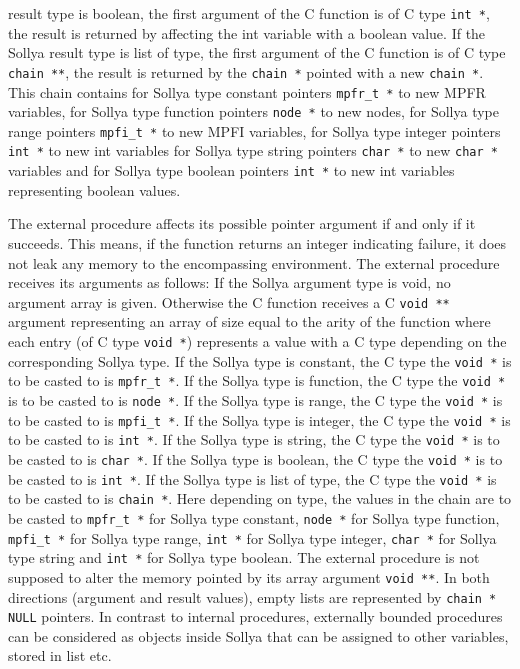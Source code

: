 \begin{itemize}
   result type is boolean, the first argument of the C function is of C
   type \texttt{int *}, the result is returned by affecting the int variable with
   a boolean value.  If the Sollya result type is list of type, the
   first argument of the C function is of C type \texttt{chain **}, the result is
   returned by the \texttt{chain *} pointed with a new \texttt{chain *}.  This chain
   contains for Sollya type constant pointers \texttt{mpfr\_t *} to new MPFR
   variables, for Sollya type function pointers \texttt{node *} to new nodes, for
   Sollya type range pointers \texttt{mpfi\_t *}  to new MPFI variables, for
   Sollya type integer pointers \texttt{int *} to new int variables for Sollya
   type string pointers \texttt{char *} to new \texttt{char *} variables and for Sollya
   type boolean pointers \texttt{int *} to new int variables representing boolean
   values.
   	       
   The external procedure affects its possible pointer argument if and
   only if it succeeds.  This means, if the function returns an integer
   indicating failure, it does not leak any memory to the encompassing
   environment.
   The external procedure receives its arguments as follows: If the
   Sollya argument type is void, no argument array is given.  Otherwise
   the C function receives a C \texttt{void **} argument representing an array of
   size equal to the arity of the function where each entry (of C type
   \texttt{void *}) represents a value with a C type depending on the
   corresponding Sollya type. If the Sollya type is constant, the C
   type the \texttt{void *} is to be casted to is \texttt{mpfr\_t *}.  If the Sollya type
   is function, the C type the \texttt{void *} is to be casted to is \texttt{node *}.  If
   the Sollya type is range, the C type the \texttt{void *} is to be casted to is
   \texttt{mpfi\_t *}.  If the Sollya type is integer, the C type the \texttt{void *} is to
   be casted to is \texttt{int *}.  If the Sollya type is string, the C type the
   \texttt{void *} is to be casted to is \texttt{char *}.  If the Sollya type is boolean,
   the C type the \texttt{void *} is to be casted to is \texttt{int *}.  If the Sollya
   type is list of type, the C type the \texttt{void *} is to be casted to is
   \texttt{chain *}.  Here depending on type, the values in the chain are to be
   casted to \texttt{mpfr\_t *}  for Sollya type constant, \texttt{node *} for Sollya type
   function, \texttt{mpfi\_t *} for Sollya type range, \texttt{int *} for Sollya type
   integer, \texttt{char *} for Sollya type string and \texttt{int *} for Sollya type
   boolean.
   The external procedure is not supposed to alter the memory pointed by
   its array argument \texttt{void **}.
   In both directions (argument and result values), empty lists are
   represented by \texttt{chain * NULL} pointers.
   In contrast to internal procedures, externally bounded procedures can
   be considered as objects inside Sollya that can be assigned to other
   variables, stored in list etc.
\end{itemize}
